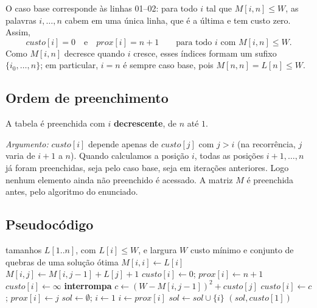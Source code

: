 \documentclass[11pt,a4paper]{article}
\begin{document}
O caso base corresponde às linhas 01--02: para todo $i$ tal que $M[i,n] \le W$, as
palavras $i,\dots,n$ cabem em uma única linha, que é a última e tem custo zero.
Assim,
\[
\mathit{custo}[i] = 0 \quad\text{e}\quad \mathit{prox}[i] = n+1
\qquad \text{para todo } i \text{ com } M[i,n]\le W.
\]
Como $M[i,n]$ decresce quando $i$ cresce, esses índices formam um sufixo
$\{i_0,\dots,n\}$; em particular, $i=n$ é sempre caso base, pois $M[n,n]=L[n]\le W$.

\subsection{Ordem de preenchimento}

A tabela é preenchida com $i$ \textbf{decrescente}, de $n$ até $1$.

\emph{Argumento:} $\mathit{custo}[i]$ depende apenas de $\mathit{custo}[j]$ com
$j > i$ (na recorrência, $j$ varia de $i+1$ a $n$). Quando calculamos a posição $i$,
todas as posições $i+1,\dots,n$ já foram preenchidas, seja pelo caso base, seja
em iterações anteriores. Logo nenhum elemento ainda não preenchido é acessado.
A matriz $M$ é preenchida antes, pelo algoritmo do enunciado.

\subsection{Pseudocódigo}

\begin{algorithm}[H]
\caption{\textsc{Impressão-Nítida-PD}$(L, n, W)$}
\begin{algorithmic}[1]
\Require tamanhos $L[1..n]$, com $L[i]\le W$, e largura $W$
\Ensure custo mínimo e conjunto de quebras de uma solução ótima
 
  \State $M[i,i] \gets L[i]$
    \State $M[i,j] \gets M[i,j-1] + L[j] + 1$
  \EndFor
\EndFor
{} 
   
    \State $\mathit{custo}[i] \gets 0$; \quad $\mathit{prox}[i] \gets n+1$
  \Else
    \State $\mathit{custo}[i] \gets \infty$
       \textbf{interrompa} \EndIf
      \State $c \gets (W - M[i,j-1])^2 + \mathit{custo}[j]$
        \State $\mathit{custo}[i] \gets c$; \quad $\mathit{prox}[i] \gets j$
      \EndIf
    \EndFor
  \EndIf
\EndFor
\State $\mathit{sol} \gets \emptyset$; \quad $i \gets 1$ 
  \State $i \gets \mathit{prox}[i]$
  \State $\mathit{sol} \gets \mathit{sol} \cup \{i\}$
\EndWhile
\State \Return $(\mathit{sol}, \mathit{custo}[1])$
\end{algorithmic}
\end{algorithm}
\end{document}
